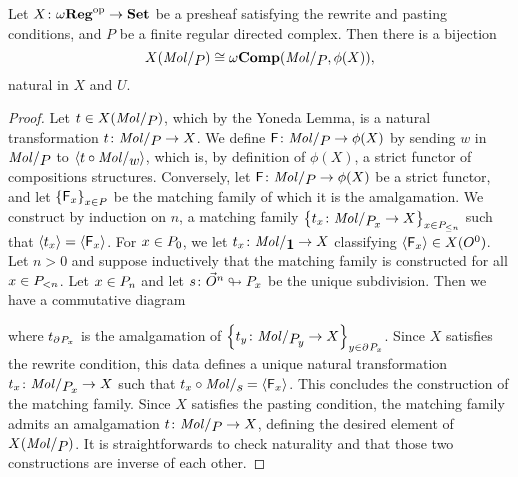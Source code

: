 \begin{lem} \label{lem:stricter_hom_set_iso_presheaf}
    Let \( X \colon \opp{\omegaReg} \to \Set \) be a presheaf satisfying the rewrite and pasting conditions, and \( P \) be a finite regular directed complex.
    Then there is a bijection
    \begin{equation*}
        X(\molecin{P}) \cong \Comp(\molecin{P}, \phi(X)),
    \end{equation*}
    natural in \( X \) and \( U \).
\end{lem}
\begin{proof}
    Let \( t \in X(\molecin{P}) \), which by the Yoneda Lemma, is a natural transformation \( t \colon \molecin{P} \to X \).
    We define \( \F \colon \molecin{P} \to \phi(X) \) by sending \( w \) in \( \molecin{P} \) to \( \pcell{t \after \molecin{w}} \), which is, by definition of \( \phi(X) \), a strict functor of compositions structures.
    Conversely, let \( \F \colon \molecin{P} \to \phi(X) \) be a strict functor, and let \( \set{\F_x}_{x \in P} \) be the matching family of which it is the amalgamation.
    We construct by induction on \( n \), a matching family \( \set{t_x \colon \molecin{\imel{P}{x}} \to X}_{x \in \gr{\le n}{P}} \) such that \( \pcell{t_x} = \pcell{\F_x} \).    
    For \( x \in \gr{0}{P} \), we let \( t_x \colon \molecin{\pt} \to X \) classifying \( \pcell{\F_x} \in X(\globe{0}) \).
    Let \( n > 0 \) and suppose inductively that the matching family is constructed for all \( x \in \gr{< n}{P} \).
    Let \( x \in \gr{n}{P} \) and let \( s \colon \dglobe{n} \sd \imel{P}{x} \) be the unique subdivision.
    Then we have a commutative diagram
    \begin{center}
    \end{center}
    where \( t_{\bd{}{} \imel{P}{x}} \) is the amalgamation of \( \set{t_y \colon \molecin{\imel{P}{y}} \to X}_{y \in \bd{}{} \imel{P}{x}} \).
    Since \( X \) satisfies the rewrite condition, this data defines a unique natural transformation \( t_x \colon \molecin{\imel{P}{x}} \to X \) such that \( t_x \after \molecin{s} = \pcell{\F_x} \).
    This concludes the construction of the matching family.
    Since \( X \) satisfies the pasting condition, the matching family admits an amalgamation \( t \colon \molecin{P} \to X \), defining the desired element of \( X(\molecin{P}) \).
    It is straightforwards to check naturality and that those two constructions are inverse of each other.
\end{proof}

